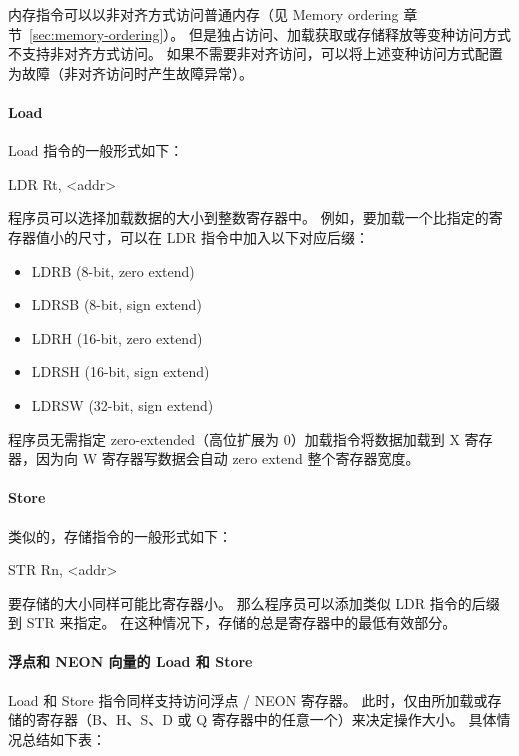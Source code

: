 内存指令可以以非对齐方式访问普通内存（见 Memory ordering 章节~\ref{sec:memory-ordering}）。
但是独占访问、加载获取或存储释放等变种访问方式不支持非对齐方式访问。
如果不需要非对齐访问，可以将上述变种访问方式配置为故障（非对齐访问时产生故障异常）。

\paragraph{Load}

Load 指令的一般形式如下：

\begin{lstcode}[numbers=none, language={[ARM]Assembler}]
  LDR Rt, <addr>
\end{lstcode}

程序员可以选择加载数据的大小到整数寄存器中。
例如，要加载一个比指定的寄存器值小的尺寸，可以在 LDR 指令中加入以下对应后缀：
\begin{itemize}
  \item LDRB (8-bit, zero extend)
  \item LDRSB (8-bit, sign extend)
  \item LDRH (16-bit, zero extend)
  \item LDRSH (16-bit, sign extend)
  \item LDRSW (32-bit, sign extend)
\end{itemize}

程序员无需指定 zero-extended（高位扩展为 0）加载指令将数据加载到 X 寄存器，因为向 W 寄存器写数据会自动 zero extend 整个寄存器宽度。

\paragraph{Store}

类似的，存储指令的一般形式如下：

\begin{lstcode}[numbers=none, language={[ARM]Assembler}]
  STR Rn, <addr>
\end{lstcode}

要存储的大小同样可能比寄存器小。
那么程序员可以添加类似 LDR 指令的后缀到 STR 来指定。
在这种情况下，存储的总是寄存器中的最低有效部分。

\paragraph{浮点和 NEON 向量的 Load 和 Store}

Load 和 Store 指令同样支持访问浮点 / NEON 寄存器。
此时，仅由所加载或存储的寄存器（B、H、S、D 或 Q 寄存器中的任意一个）来决定操作大小。
具体情况总结如下表：

